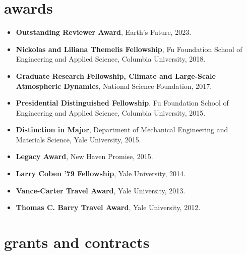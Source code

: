 \documentclass[10pt,oneside]{article}
\begin{document}

\section{awards}

\mbox{}\vspace{-\dimexpr\baselineskip\relax}

\begin{itemize}[label={}]

  \item \textbf{Outstanding Reviewer Award}, Earth's Future, 2023.

  \item \textbf{Nickolas and Liliana Themelis Fellowship}, Fu Foundation School of Engineering and Applied Science, Columbia University, 2018.

  \item \textbf{Graduate Research Fellowship, Climate and Large-Scale Atmospheric Dynamics}, National Science Foundation, 2017.

  \item \textbf{Presidential Distinguished Fellowship}, Fu Foundation School of Engineering and Applied Science, Columbia University, 2015.

  \item \textbf{Distinction in Major}, Department of Mechanical Engineering and Materials Science, Yale University, 2015.

  \item \textbf{Legacy Award}, New Haven Promise, 2015.

  \item \textbf{Larry Coben '79 Fellowship}, Yale University, 2014.

  \item \textbf{Vance-Carter Travel Award}, Yale University, 2013.

  \item \textbf{Thomas C. Barry Travel Award}, Yale University, 2012.

\end{itemize}



\section{grants and contracts}

\mbox{}\vspace{-\dimexpr\baselineskip\relax}
\end{document}
